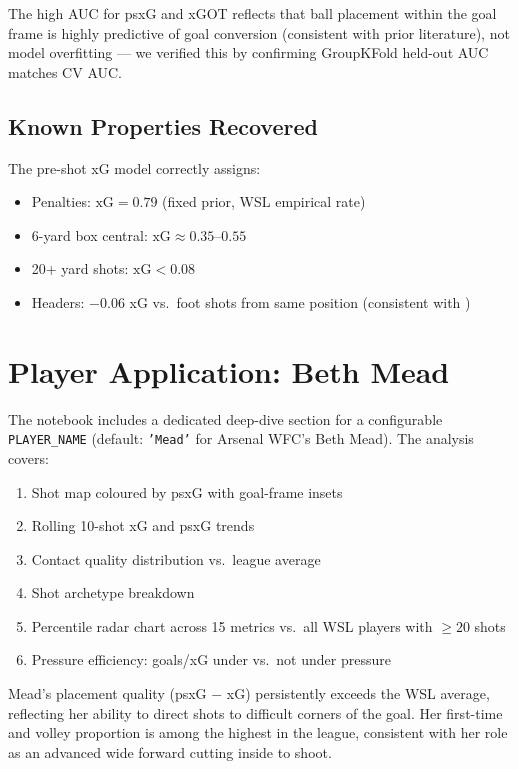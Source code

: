 \documentclass[12pt,a4paper]{article}
\begin{document}
The high AUC for psxG and xGOT reflects that ball placement within the goal frame is highly predictive of goal conversion (consistent with prior literature), not model overfitting — we verified this by confirming GroupKFold held-out AUC matches CV AUC.

\subsection{Known Properties Recovered}

The pre-shot xG model correctly assigns:
\begin{itemize}
    \item Penalties: $\text{xG} = 0.79$ (fixed prior, WSL empirical rate)
    \item 6-yard box central: $\text{xG} \approx 0.35$--$0.55$
    \item 20+ yard shots: $\text{xG} < 0.08$
    \item Headers: $-0.06$ xG vs.\ foot shots from same position (consistent with \citealt{rathke2017})
\end{itemize}

\section{Player Application: Beth Mead}
\label{sec:mead}

The notebook includes a dedicated deep-dive section for a configurable \texttt{PLAYER\_NAME} (default: \texttt{'Mead'} for Arsenal WFC's Beth Mead). The analysis covers:

\begin{enumerate}
    \item Shot map coloured by psxG with goal-frame insets
    \item Rolling 10-shot xG and psxG trends
    \item Contact quality distribution vs.\ league average
    \item Shot archetype breakdown
    \item Percentile radar chart across 15 metrics vs.\ all WSL players with $\geq 20$ shots
    \item Pressure efficiency: goals/xG under vs.\ not under pressure
\end{enumerate}

Mead's placement quality (psxG $-$ xG) persistently exceeds the WSL average, reflecting her ability to direct shots to difficult corners of the goal. Her first-time and volley proportion is among the highest in the league, consistent with her role as an advanced wide forward cutting inside to shoot.
\end{document}
